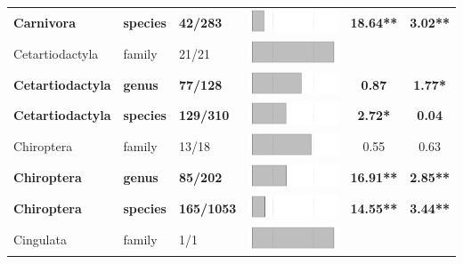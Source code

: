 \begin{longtable}{lL{1.8cm}C{2cm}lcc}
  \textbf{Carnivora} & \textbf{species} & \textbf{42/283} & \includegraphics[width=0.20\linewidth, height=0.05\linewidth]{Table_figures/bar6.pdf} & \textbf{18.64**} & \textbf{3.02**} \\ 
  Cetartiodactyla & family & 21/21 & \includegraphics[width=0.20\linewidth, height=0.05\linewidth]{Table_figures/bar7.pdf} &   &   \\ 
  \textbf{Cetartiodactyla} & \textbf{genus} & \textbf{77/128} & \includegraphics[width=0.20\linewidth, height=0.05\linewidth]{Table_figures/bar8.pdf} & \textbf{0.87} & \textbf{1.77*} \\ 
  \textbf{Cetartiodactyla} & \textbf{species} & \textbf{129/310} & \includegraphics[width=0.20\linewidth, height=0.05\linewidth]{Table_figures/bar9.pdf} & \textbf{2.72*} & \textbf{0.04} \\ 
  Chiroptera & family & 13/18 & \includegraphics[width=0.20\linewidth, height=0.05\linewidth]{Table_figures/bar10.pdf} & 0.55 & 0.63 \\ 
  \textbf{Chiroptera} & \textbf{genus} & \textbf{85/202} & \includegraphics[width=0.20\linewidth, height=0.05\linewidth]{Table_figures/bar11.pdf} & \textbf{16.91**} & \textbf{2.85**} \\ 
  \textbf{Chiroptera} & \textbf{species} & \textbf{165/1053} & \includegraphics[width=0.20\linewidth, height=0.05\linewidth]{Table_figures/bar12.pdf} & \textbf{14.55**} & \textbf{3.44**} \\ 
  Cingulata & family & 1/1 & \includegraphics[width=0.20\linewidth, height=0.05\linewidth]{Table_figures/bar13.pdf} &   &   \\ 

\end{longtable}
